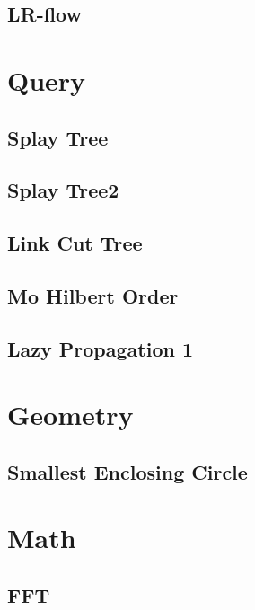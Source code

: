 \documentclass[10pt,landscape,a4paper,twocolumn]{article}
\begin{document}
\subsection{LR-flow}


%
\section{Query}

\subsection{Splay Tree}


\subsection{Splay Tree2}


\subsection{Link Cut Tree}


\subsection{Mo Hilbert Order}


\subsection{Lazy Propagation 1}


\section{Geometry}

\subsection{Smallest Enclosing Circle}


\section{Math}
\subsection{FFT}

\end{document}
